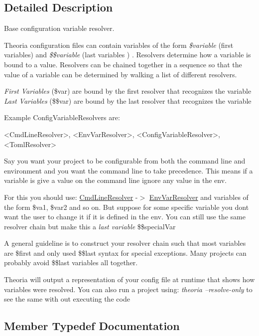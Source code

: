 \subsection{Detailed Description}
Base configuration variable resolver.

Theoria configuration files can contain variables of the form {\itshape \$variable} (\textquotesingle{}first variables\textquotesingle{}) and {\itshape \$\$variable} (\textquotesingle{}last variables \textquotesingle{}) . Resolvers determine how a variable is bound to a value. Resolvers can be chained together in a sequence so that the value of a variable can be determined by walking a list of different resolvers.

{\itshape First Variables} (\$var) are bound by the first resolver that recognizes the variable {\itshape Last Variables} (\$\$var) are bound by the last resolver that recognizes the variable

Example Config\+Variable\+Resolvers are\+:\begin{DoxyVerb}<CmdLineResolver>, <EnvVarResolver>, <ConfigVariableResolver>, <TomlResolver> \end{DoxyVerb}


Say you want your project to be configurable from both the command line and environment and you want the command line to take precedence. This means if a variable is give a value on the command line ignore any value in the env.

For this you should use\+: \hyperlink{classtheoria_1_1config_1_1CmdLineResolver}{Cmd\+Line\+Resolver} -\/$>$ \hyperlink{classtheoria_1_1config_1_1EnvVarResolver}{Env\+Var\+Resolver} and variables of the form \$va1, \$var2 and so on. But suppose for some specific variable you don\textquotesingle{}t want the user to change it if it is defined in the env. You can still use the same resolver chain but make this a {\itshape last variable} \$\$special\+Var

A general guideline is to construct your resolver chain such that most variables are \$first and only used \$\$last syntax for special exceptions. Many projects can probably avoid \$\$last variables all together.

Theoria will output a representation of your config file at runtime that shows how variables were resolved. You can also run a project using\+: {\itshape theoria --resolve-\/only} to see the same with out executing the code 

\subsection{Member Typedef Documentation}
\mbox{\label{classtheoria_1_1config_1_1ConfigVariableResolver_af27a85262d802c9ad4ecb1179efaf447}} 
